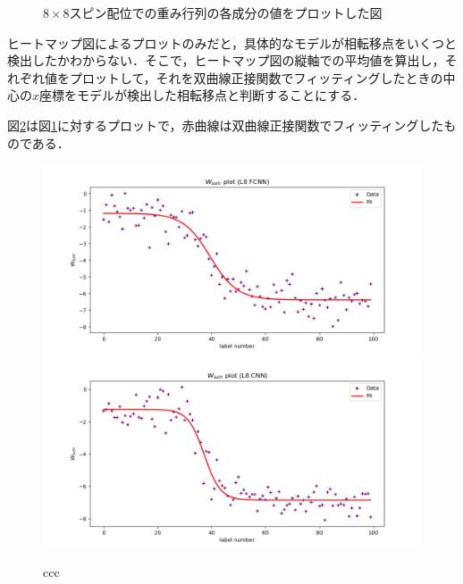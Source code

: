 \documentclass[a4paper,11pt]{jsreport}
\begin{document}
\begin{figure}[H]
\begin{minipage}[b]{0.45\linewidth}
\begin{center}
    \end{center}
  \end{minipage}
  \caption{$8 \times 8$スピン配位での重み行列の各成分の値をプロットした図}
  \label{温度測定器ヒートマップ8}
\end{figure}

ヒートマップ図によるプロットのみだと，具体的なモデルが相転移点をいくつと検出したかわからない．そこで，ヒートマップ図の縦軸での平均値を算出し，それぞれ値をプロットして，それを双曲線正接関数でフィッティングしたときの中心の$x$座標をモデルが検出した相転移点と判断することにする．\par
図\ref{温度測定器プロット8}は図\ref{温度測定器ヒートマップ8}に対するプロットで，赤曲線は双曲線正接関数でフィッティングしたものである．

\begin{figure}[H]
  \begin{center}
    \includegraphics[width=\linewidth]{image/L8_FCNN_weight_sum.png}
    \includegraphics[width=\linewidth]{image/L8_CNN_weight_sum.png}
  \end{center}
  \caption{ccc}
  \label{温度測定器プロット8}
\end{figure}
\end{document}

